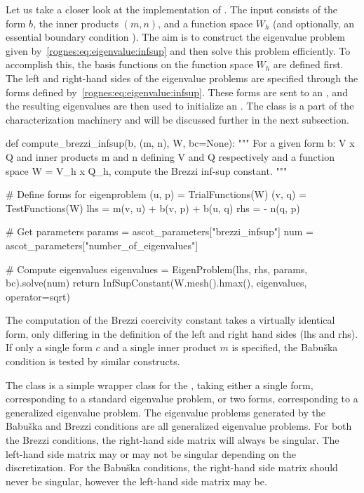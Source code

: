 Let us take a closer look at the implementation
of . The input consists of
the form $b$, the inner products $(m, n)$, and a function space $W_h$
(and optionally, an essential boundary
condition ). The aim is to construct the
eigenvalue problem given by~\eqref{rognes:eq:eigenvalue:infsup} and
then solve this problem efficiently. To accomplish this, the basis
functions on the function space $W_h$ are defined first. The left and
right-hand sides of the eigenvalue problems are specified through the
forms defined by~\eqref{rognes:eq:eigenvalue:infsup}. These forms are
sent to an
, and the resulting eigenvalues are then
used to initialize an . The
 class is a part of the
characterization machinery and will be discussed further in the next
subsection.
\begin{python}
def compute_brezzi_infsup(b, (m, n), W, bc=None):
    """
    For a given form b: V x Q \rightarrow \R and inner products m and
    n defining V and Q respectively and a function space W = V_h x
    Q_h, compute the Brezzi inf-sup constant.
    """

    # Define forms for eigenproblem
    (u, p) = TrialFunctions(W)
    (v, q) = TestFunctions(W)
    lhs = m(v, u) + b(v, p) + b(u, q)
    rhs = - n(q, p)

    # Get parameters
    params = ascot_parameters["brezzi_infsup"]
    num = ascot_parameters["number_of_eigenvalues"]

    # Compute eigenvalues
    eigenvalues = EigenProblem(lhs, rhs, params, bc).solve(num)
    return InfSupConstant(W.mesh().hmax(), eigenvalues, operator=sqrt)
\end{python}
The computation of the Brezzi coercivity constant takes a
virtually identical form, only differing in the definition of the left
and right hand sides (lhs and rhs). If only a single form $c$ and a
single inner product $m$ is specified, the Babu\v ska condition is
tested by similar constructs.

The  class is a simple wrapper class for the
\dolfin{} , taking either a single form,
corresponding to a standard eigenvalue problem, or two forms,
corresponding to a generalized eigenvalue problem. The eigenvalue
problems generated by the Babu\v ska and Brezzi conditions are all
generalized eigenvalue problems. For both the Brezzi conditions, the
right-hand side matrix will always be singular. The left-hand side
matrix may or may not be singular depending on the discretization. For
the Babu\v ska conditions, the right-hand side matrix should never be
singular, however the left-hand side matrix may be.

